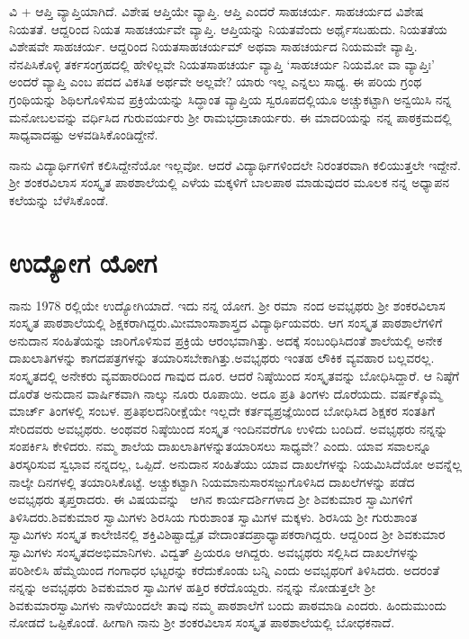 {ವಿ + ಆಪ್ತಿ   \enginline{-}   ವ್ಯಾಪ್ತಿಯಾಗಿದೆ.  ವಿಶೇಷ ಆಪ್ತಿಯೇ ವ್ಯಾಪ್ತಿ.  ಆಪ್ತಿ ಎಂದರೆ ಸಾಹಚರ್ಯ.  ಸಾಹಚರ್ಯದ ವಿಶೇಷ ನಿಯತತೆ.  ಆದ್ದರಿಂದ ನಿಯತ ಸಾಹಚರ್ಯವೇ ವ್ಯಾಪ್ತಿ. ಆಪ್ತಿಯನ್ನು ನಿಯತವೆಂದು ಅರ್ಥೈಸಬಹುದು.  ನಿಯತತೆಯ ವಿಶೇಷವೇ ಸಾಹಚರ್ಯ.  ಆದ್ದರಿಂದ ನಿಯತಸಾಹಚರ್ಯಮ್ ಅಥವಾ ಸಾಹಚರ್ಯದ ನಿಯಮವೇ ವ್ಯಾಪ್ತಿ.  ನೆನಪಿಸಿಕೊಳ್ಳಿ ತರ್ಕಸಂಗ್ರಹದಲ್ಲಿ ಹೇಳಿಲ್ಲವೇ ನಿಯತಸಾಹಚರ್ಯ ವ್ಯಾಪ್ತಿ   \enginline{-} ‘ಸಾಹಚರ್ಯ ನಿಯಮೋ ವಾ ವ್ಯಾಪ್ತಿಃ’ ಅಂದರೆ ವ್ಯಾಪ್ತಿ ಎಂಬ ಪದದ ವಿಕಸಿತ ಅರ್ಥವೇ  ಅಲ್ಲವೇ? ಯಾರು ಇಲ್ಲ ಎನ್ನಲು ಸಾಧ್ಯ. ಈ ಪರಿಯ ಗ್ರಂಥ ಗ್ರಂಥಿಯನ್ನು ಶಿಥಿಲಗೊಳಿಸುವ ಪ್ರಕ್ರಿಯೆಯನ್ನು ಸಿದ್ಧಾಂತ ವ್ಯಾಪ್ತಿಯ ಸ್ವರೂಪದಲ್ಲಿಯೂ ಅಚ್ಚು\-ಕಟ್ಟಾಗಿ ಅನ್ವಯಿಸಿ ನನ್ನ ಮನೋಬಲವನ್ನು ವರ್ಧಿಸಿದ ಗುರುವರ್ಯರು ಶ್ರೀ ರಾಮಭದ್ರಾಚಾರ್ಯರು.  ಈ ಮಾದರಿಯನ್ನು ನನ್ನ ಪಾಠಕ್ರಮದಲ್ಲಿ ಸಾಧ್ಯವಾದಷ್ಟು ಅಳವಡಿಸಿ\-ಕೊಂಡಿದ್ದೇನೆ.

ನಾನು ವಿದ್ಯಾರ್ಥಿಗಳಿಗೆ ಕಲಿಸಿದ್ದೇನೆಯೋ ಇಲ್ಲವೋ.  ಆದರೆ ವಿದ್ಯಾರ್ಥಿಗಳಿಂದಲೇ ನಿರಂತರವಾಗಿ ಕಲಿಯುತ್ತಲೇ ಇದ್ದೇನೆ.  ಶ್ರೀ ಶಂಕರವಿಲಾಸ ಸಂಸ್ಕೃತ ಪಾಠಶಾಲೆಯಲ್ಲಿ ಎಳೆಯ ಮಕ್ಕಳಿಗೆ ಬಾಲಪಾಠ ಮಾಡುವುದರ ಮೂಲಕ ನನ್ನ ಅಧ್ಯಾಪನ ಕಲೆಯನ್ನು ಬೆಳೆಸಿ\-ಕೊಂಡೆ.

\section*{ಉದ್ಯೋಗ ಯೋಗ}

ನಾನು 1978 ರಲ್ಲಿಯೇ ಉದ್ಯೋಗಿಯಾದೆ.  ಇದು ನನ್ನ ಯೋಗ.  ಶ್ರೀ ರಮಾ~ನಂದ ಅವಭೃಥರು ಶ್ರೀ ಶಂಕರವಿಲಾಸ ಸಂಸ್ಕೃತ ಪಾಠಶಾಲೆಯಲ್ಲಿ ಶಿಕ್ಷಕರಾಗಿದ್ದರು.\break  ಮೀಮಾಂಸಾಶಾಸ್ತ್ರದ ವಿದ್ಯಾರ್ಥಿಯವರು.  ಆಗ ಸಂಸ್ಕೃತ ಪಾಠಶಾಲೆಗಳಿಗೆ ಅನುದಾನ ಸಂಹಿತೆಯನ್ನು ಜಾರಿಗೊಳಿಸುವ ಪ್ರಕ್ರಿಯೆ ಆರಂಭವಾಗಿತ್ತು.  ಅದಕ್ಕೆ ಸಂಬಂಧಿಸಿದಂತೆ ಶಾಲೆಯಲ್ಲಿ ಅನೇಕ ದಾಖಲಾತಿಗಳನ್ನು ಕಾಗದಪತ್ರಗಳನ್ನು ತಯಾರಿಸಬೇಕಾಗಿತ್ತು.\break   ಅವಭೃಥರು ಇಂತಹ ಲೌಕಿಕ ವ್ಯವಹಾರ ಬಲ್ಲವರಲ್ಲ.  ಸಂಸ್ಕೃತದಲ್ಲಿ ಅನೇಕರು ವ್ಯವಹಾರದಿಂದ ಗಾವುದ ದೂರ.  ಆದರೆ ನಿಷ್ಠೆಯಿಂದ ಸಂಸ್ಕೃತವನ್ನು ಬೋಧಿಸಿದ್ದಾರೆ.  ಆ ನಿಷ್ಠೆಗೆ ದೊರೆತ ಅನುದಾನ ವಾರ್ಷಿಕವಾಗಿ ನಾಲ್ಕು ನೂರು ರೂಪಾಯಿ.  ಅದೂ ಪ್ರತಿ ತಿಂಗಳು ದೊರೆಯದು.  ವರ್ಷಕ್ಕೊಮ್ಮೆ ಮಾರ್ಚ್ ತಿಂಗಳಲ್ಲಿ ಸಂಬಳ.   ಪ್ರತಿಫಲದ\break ನಿರೀಕ್ಷೆಯೇ  ಇಲ್ಲದೇ ಕರ್ತವ್ಯಪ್ರಜ್ಞೆಯಿಂದ ಬೋಧಿಸಿದ ಶಿಕ್ಷಕರ ಸಂತತಿಗೆ ಸೇರಿದವರು ಅವ\-ಭೃಥರು.  ಅಂಥವರ ನಿಷ್ಠೆಯಿಂದ ಸಂಸ್ಕೃತ ಇಂದಿನವರೆಗೂ ಉಳಿದು ಬಂದಿದೆ.  ಅವಭೃಥರು ನನ್ನನ್ನು ಸಂಪರ್ಕಿಸಿ ಕೇಳಿದರು. ನಮ್ಮ ಶಾಲೆಯ ದಾಖಲಾತಿಗಳನ್ನು\break ತಯಾರಿಸಲು ಸಾಧ್ಯವೇ? ಎಂದು.  ಯಾವ ಸವಾಲನ್ನೂ ತಿರಸ್ಕರಿಸುವ ಸ್ವಭಾವ ನನ್ನದಲ್ಲ, ಒಪ್ಪಿದೆ.  ಅನುದಾನ ಸಂಹಿತೆಯು ಯಾವ ದಾಖಲೆಗಳನ್ನು ನಿಯಮಿಸಿದೆಯೋ ಅವನ್ನೆಲ್ಲ ನಾಲ್ಕೇ ದಿನಗಳಲ್ಲಿ ತಯಾರಿಸಿಕೊಟ್ಟೆ.  ಅಚ್ಚುಕಟ್ಟಾಗಿ ನಿಯಮಾನುಸಾರ\break  ಸಜ್ಜುಗೊಳಿಸಿದ ದಾಖಲೆ\-ಗಳನ್ನು ಪಡೆದ ಅವಭೃಥರು ತೃಪ್ತರಾದರು.  ಈ \hbox{ವಿಷಯವನ್ನು } ಆಗಿನ ಕಾರ್ಯದರ್ಶಿಗಳಾದ ಶ್ರೀ ಶಿವಕುಮಾರ ಸ್ವಾಮಿಗಳಿಗೆ ತಿಳಿಸಿದರು.\break ಶಿವಕುಮಾರ ಸ್ವಾಮಿಗಳು ಶಿರಸಿಯ ಗುರುಶಾಂತ ಸ್ವಾಮಿಗಳ ಮಕ್ಕಳು.  ಶಿರಸಿಯ ಶ್ರೀ ಗುರುಶಾಂತ ಸ್ವಾಮಿಗಳು ಸಂಸ್ಕೃತ ಕಾಲೇಜಿನಲ್ಲಿ  ಶಕ್ತಿವಿಶಿಷ್ಟಾದ್ವೈತ ವೇದಾಂತದ\break ಪ್ರಾಧ್ಯಾಪಕರಾಗಿದ್ದರು.  ಆದ್ದರಿಂದ ಶ್ರೀ ಶಿವಕುಮಾರ ಸ್ವಾಮಿಗಳು ಸಂಸ್ಕೃತದ\break ಅಭಿಮಾನಿಗಳು. ವಿದ್ವತ್ ಪ್ರಿಯರೂ ಆಗಿದ್ದರು.  ಅವಭೃಥರು ಸಲ್ಲಿಸಿದ \hbox{ದಾಖಲೆಗಳನ್ನು} ಪರಿಶೀಲಿಸಿ ಹೆಮ್ಮೆಯಿಂದ ಗಂಗಾಧರ ಭಟ್ಟರನ್ನು ಕರೆದುಕೊಂಡು ಬನ್ನಿ ಎಂದು \hbox{ಅವಭೃಥರಿಗೆ} ತಿಳಿಸಿದರು.  ಅದರಂತೆ ನನ್ನನ್ನು ಅವ\-ಭೃಥರು ಶಿವಕುಮಾರ ಸ್ವಾಮಿಗಳ ಹತ್ತಿರ ಕರೆದೊಯ್ದರು.  ನನ್ನನ್ನು ನೋಡುತ್ತಲೇ ಶ್ರೀ ಶಿವ\-ಕುಮಾರಸ್ವಾಮಿಗಳು ನಾಳೆಯಿಂದಲೇ ತಾವು ನಮ್ಮ ಪಾಠಶಾಲೆಗೆ ಬಂದು ಪಾಠಮಾಡಿ ಎಂದರು.  ಹಿಂದುಮುಂದು ನೋಡದೆ ಒಪ್ಪಿಕೊಂಡೆ.  ಹೀಗಾಗಿ ನಾನು ಶ್ರೀ ಶಂಕರ\-ವಿಲಾಸ ಸಂಸ್ಕೃತ ಪಾಠಶಾಲೆಯಲ್ಲಿ ಬೋಧಕನಾದೆ.  

}
